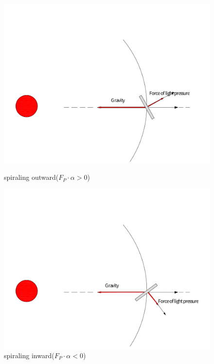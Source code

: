 \documentclass[../Paper.tex]{subfiles}
\begin{document}
\begin{figure}[H]
 \begin{minipage}[t]{0.5\linewidth}
 \centering{}
 \includegraphics[scale=0.25]{../Figures/accelerate.pdf}
 \caption{spiraling outward($F_P\cdot\alpha>0$)}
 \label{fig:side:a}
 \end{minipage}
 \begin{minipage}[t]{0.5\linewidth}
 \centering{}
 \includegraphics[scale=0.25]{../Figures/decrease.pdf}
 \caption{spiraling inward($F_P\cdot\alpha<0$)}
 \label{fig:side:b}
 \end{minipage}
\end{figure}
\end{document}
